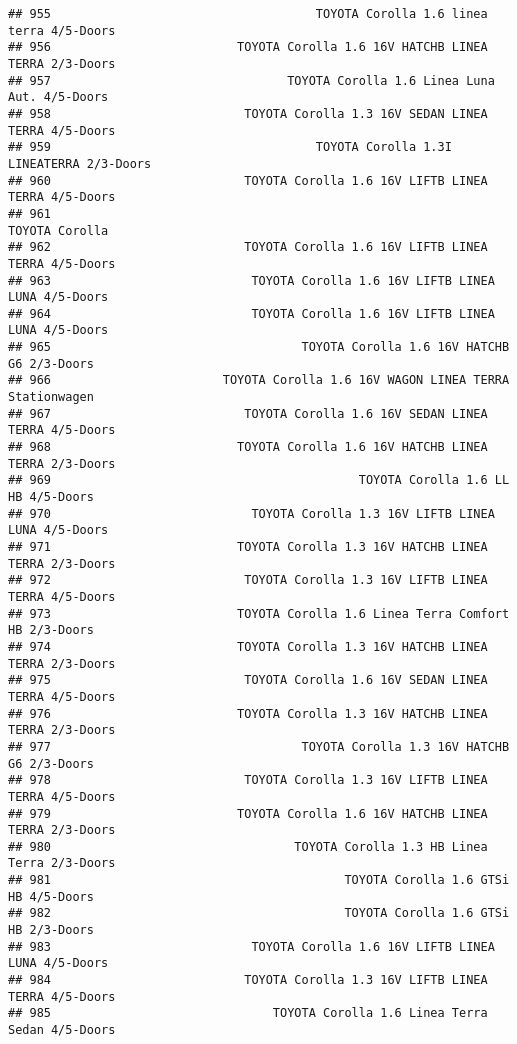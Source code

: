 \documentclass[]{article}
\begin{document}
\begin{verbatim}
## 955                                     TOYOTA Corolla 1.6 linea terra 4/5-Doors
## 956                          TOYOTA Corolla 1.6 16V HATCHB LINEA TERRA 2/3-Doors
## 957                                 TOYOTA Corolla 1.6 Linea Luna Aut. 4/5-Doors
## 958                           TOYOTA Corolla 1.3 16V SEDAN LINEA TERRA 4/5-Doors
## 959                                     TOYOTA Corolla 1.3I LINEATERRA 2/3-Doors
## 960                           TOYOTA Corolla 1.6 16V LIFTB LINEA TERRA 4/5-Doors
## 961                                                              TOYOTA Corolla 
## 962                           TOYOTA Corolla 1.6 16V LIFTB LINEA TERRA 4/5-Doors
## 963                            TOYOTA Corolla 1.6 16V LIFTB LINEA LUNA 4/5-Doors
## 964                            TOYOTA Corolla 1.6 16V LIFTB LINEA LUNA 4/5-Doors
## 965                                   TOYOTA Corolla 1.6 16V HATCHB G6 2/3-Doors
## 966                        TOYOTA Corolla 1.6 16V WAGON LINEA TERRA Stationwagen
## 967                           TOYOTA Corolla 1.6 16V SEDAN LINEA TERRA 4/5-Doors
## 968                          TOYOTA Corolla 1.6 16V HATCHB LINEA TERRA 2/3-Doors
## 969                                           TOYOTA Corolla 1.6 LL HB 4/5-Doors
## 970                            TOYOTA Corolla 1.3 16V LIFTB LINEA LUNA 4/5-Doors
## 971                          TOYOTA Corolla 1.3 16V HATCHB LINEA TERRA 2/3-Doors
## 972                           TOYOTA Corolla 1.3 16V LIFTB LINEA TERRA 4/5-Doors
## 973                          TOYOTA Corolla 1.6 Linea Terra Comfort HB 2/3-Doors
## 974                          TOYOTA Corolla 1.3 16V HATCHB LINEA TERRA 2/3-Doors
## 975                           TOYOTA Corolla 1.6 16V SEDAN LINEA TERRA 4/5-Doors
## 976                          TOYOTA Corolla 1.3 16V HATCHB LINEA TERRA 2/3-Doors
## 977                                   TOYOTA Corolla 1.3 16V HATCHB G6 2/3-Doors
## 978                           TOYOTA Corolla 1.3 16V LIFTB LINEA TERRA 4/5-Doors
## 979                          TOYOTA Corolla 1.6 16V HATCHB LINEA TERRA 2/3-Doors
## 980                                  TOYOTA Corolla 1.3 HB Linea Terra 2/3-Doors
## 981                                         TOYOTA Corolla 1.6 GTSi HB 4/5-Doors
## 982                                         TOYOTA Corolla 1.6 GTSi HB 2/3-Doors
## 983                            TOYOTA Corolla 1.6 16V LIFTB LINEA LUNA 4/5-Doors
## 984                           TOYOTA Corolla 1.3 16V LIFTB LINEA TERRA 4/5-Doors
## 985                               TOYOTA Corolla 1.6 Linea Terra Sedan 4/5-Doors

\end{verbatim}
\end{document}
